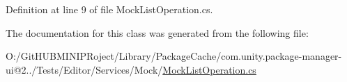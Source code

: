 Definition at line 9 of file Mock\+List\+Operation.\+cs.



The documentation for this class was generated from the following file\+:\begin{DoxyCompactItemize}
\item 
O\+:/\+Git\+H\+U\+B\+M\+I\+N\+I\+P\+Roject/\+Library/\+Package\+Cache/com.\+unity.\+package-\/manager-\/ui@2../\+Tests/\+Editor/\+Services/\+Mock/\mbox{\hyperlink{_mock_list_operation_8cs}{Mock\+List\+Operation.\+cs}}\end{DoxyCompactItemize}

